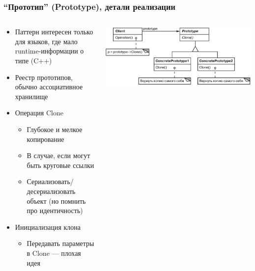 \documentclass[xetex,mathserif,serif]{beamer}
\begin{document}
	\begin{frame}
		\frametitle{``Прототип'' (Prototype), детали реализации}
		\begin{columns}
			\begin{column}{0.5\textwidth}
				\begin{itemize}
					\item Паттерн интересен только для языков, где мало runtime-информации о типе (C++)
					\item Реестр прототипов, обычно ассоциативное хранилище
					\item Операция Clone
					\begin{itemize}
						\item Глубокое и мелкое копирование
						\item В случае, если могут быть круговые ссылки
						\item Сериализовать/десериализовать объект (но помнить про идентичность)
					\end{itemize}
					\item Инициализация клона
					\begin{itemize}
						\item Передавать параметры в Clone --- плохая идея
					\end{itemize}
				\end{itemize}
			\end{column}
			\begin{column}{0.5\textwidth}
				\begin{center}
					\includegraphics[width=\textwidth]{prototype.png}
				\end{center}
			\end{column}
		\end{columns}
	\end{frame}
\end{document}
